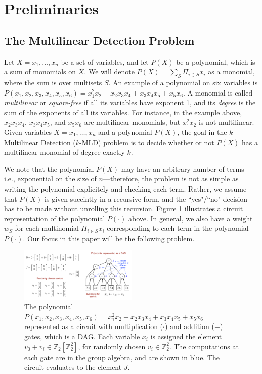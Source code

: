\section{Preliminaries}
\label{sec:prelim}

\subsection{The Multilinear Detection Problem}
Let $X = x_1, \ldots,x_n$ be a set of variables, and let $P(X)$ be a polynomial, which is a sum 
of monomials on $X$. We will denote $P(X)=\sum_S \Pi_{i\in S} x_i$ as a monomial, where
the sum is over multisets $S$.  An example of a polynomial on six variables is 
$P(x_1,x_2,x_3,x_4, x_5, x_6) = x_1^2x_2 + x_2x_3x_4 + x_3x_4x_5 + x_5x_6$. 
A monomial is called \emph{multilinear} or \emph{square-free} if all its variables 
have exponent 1, and its \emph{degree} is the sum of the exponents of all its variables. 
For instance, in the example above, $x_2x_3x_4$, $x_3x_4x_5$, and $x_5x_6$ are multilinear monomials, but $x_1^2x_2$ is not multilinear. 
Given variables $X = x_1, \ldots ,x_n$ and a polynomial $P(X)$, the goal in 
the $k$-Multilinear Detection (\textsc{$k$-MLD}) problem
is to decide whether or not $P(X)$ has a multilinear monomial of degree exactly $k$. 


We note that the polynomial $P(X)$ may have an arbitrary number of terms---i.e., exponential on the size of $n$---therefore, the problem is not as simple as writing the polynomial explicitely and checking each term. Rather, we assume that $P(X)$ is given succintly in a recursive form, and the ``yes"/``no" decision has to be made without unrolling this recursion.
Figure \ref{fig:dag} illustrates a circuit representation of the polynomial $P(\cdot)$ above.
In general, we also have a weight $w_S$ for each multinomial $\Pi_{i\in S} x_i$ corresponding
to each term in the polynomial $P(\cdot)$. Our focus in this paper will be the following problem.

\begin{figure}[h]
\includegraphics[width=0.5\textwidth]{img/dag3_fixed.pdf}
\caption{
\small
The polynomial $P(x_1,x_2,x_3,x_4, x_5, x_6) = x_1^2x_2 + x_2x_3x_4 + x_3x_4x_5 + x_5x_6$
represented as a circuit with multiplication ($\cdot$) and addition ($+$) gates, which is a DAG. 
Each variable $x_i$ is assigned the element $v_0+v_i\in\mathbb{Z}_2[\mathbb{Z}_2^2]$,
for randomly chosen $v_i\in \mathbb{Z}_2^2$. The computations at each gate
are in the group algebra, and are shown in blue. The circuit evaluates to the element $J$.
\vspace{-0.2in}
}
\label{fig:dag}
\end{figure}

